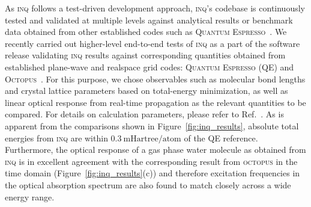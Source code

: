 As \textsc{inq} follows a test-driven development approach, \textsc{inq}'s codebase is continuously tested and validated at multiple levels against analytical results or benchmark data obtained from other established codes such as \textsc{Quantum Espresso}~\cite{Giannozzi2009}. 
We recently carried out higher-level end-to-end tests of \textsc{inq} as a part of the software release validating \textsc{inq} results against corresponding quantities obtained from established plane-wave and realspace grid codes: \textsc{Quantum Espresso} (QE) and \textsc{Octopus}~\cite{Tancogne2020}. 
For this purpose, we chose observables such as molecular bond lengths and crystal lattice parameters based on total-energy minimization, as well as linear optical response from real-time propagation as the relevant quantities to be compared. 
For details on calculation parameters, please refer to Ref.~\cite{Andrade2021}. 
As is apparent from the comparisons shown in Figure~\ref{fig:inq_results}, absolute total energies from \textsc{inq} are within \(0.3~\mathrm{mHartree/atom}\) of the QE reference. 
Furthermore, the optical response of a gas phase water molecule as obtained from \textsc{inq} is in excellent agreement with the corresponding result from \textsc{octopus} in the time domain (Figure~\ref{fig:inq_results}(c)) and therefore excitation frequencies in the optical absorption spectrum are also found to match closely across a wide energy range. 


